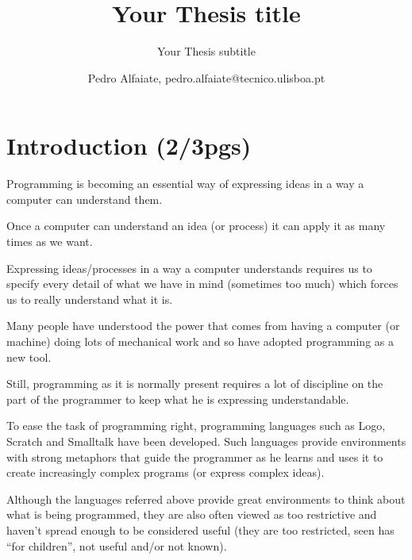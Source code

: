 \documentclass{./llncs2e/llncs}
\begin{document}
\title{Your Thesis title}

\subtitle{Your Thesis subtitle}
\author{Pedro Alfaiate, pedro.alfaiate@tecnico.ulisboa.pt}

\maketitle

\begin{abstract}

\end{abstract}
\begin{keywords}

\end{keywords}
\section{Introduction (2/3pgs)}
	Programming is becoming an essential way of expressing ideas in a way a computer can understand them.

	Once a computer can understand an idea (or process) it can apply it as many times as we want.

	Expressing ideas/processes in a way a computer understands requires us to specify every detail of what we have in mind (sometimes too much) which forces us to really understand what it is.

	Many people have understood the power that comes from having a computer (or machine) doing lots of mechanical work and so have adopted programming as a new tool.

	Still, programming as it is normally present requires a lot of discipline on the part of the programmer to keep what he is expressing understandable.

	To ease the task of programming right, programming languages such as Logo\cite{papert1999logo}, Scratch\cite{Resnick:2009:SP:1592761.1592779} and Smalltalk\cite{goldberg1983smalltalk} have been developed. Such languages provide environments with strong metaphors that guide the programmer as he learns and uses it to create increasingly complex programs (or express complex ideas).

	Although the languages referred above provide great environments to think about what is being programmed, they are also often viewed as too restrictive and haven't spread enough to be considered useful (they are too restricted, seen has ``for children'', not useful and/or not known).
\end{document}
